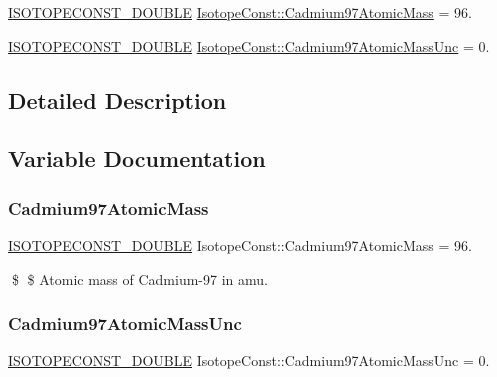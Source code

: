 \begin{DoxyCompactItemize}
\item 
\mbox{\hyperlink{group___isotope_const-_macros_ga8f45a7272ce02c0b4c65c44636ed719a}{I\+S\+O\+T\+O\+P\+E\+C\+O\+N\+S\+T\+\_\+\+D\+O\+U\+B\+LE}} \mbox{\hyperlink{group___isotope_const-_cadmium-_cd97_ga5261e2f44021d0584f46f1d3da004dc6}{Isotope\+Const\+::\+Cadmium97\+Atomic\+Mass}} = 96.
\item 
\mbox{\hyperlink{group___isotope_const-_macros_ga8f45a7272ce02c0b4c65c44636ed719a}{I\+S\+O\+T\+O\+P\+E\+C\+O\+N\+S\+T\+\_\+\+D\+O\+U\+B\+LE}} \mbox{\hyperlink{group___isotope_const-_cadmium-_cd97_gaddfb262f5f44c97405492b9e3bffd4db}{Isotope\+Const\+::\+Cadmium97\+Atomic\+Mass\+Unc}} = 0.
\end{DoxyCompactItemize}


\subsection{Detailed Description}


\subsection{Variable Documentation}
\mbox{\label{group___isotope_const-_cadmium-_cd97_ga5261e2f44021d0584f46f1d3da004dc6}} 
\subsubsection{\texorpdfstring{Cadmium97\+Atomic\+Mass}{Cadmium97AtomicMass}}
{\footnotesize\ttfamily \mbox{\hyperlink{group___isotope_const-_macros_ga8f45a7272ce02c0b4c65c44636ed719a}{I\+S\+O\+T\+O\+P\+E\+C\+O\+N\+S\+T\+\_\+\+D\+O\+U\+B\+LE}} Isotope\+Const\+::\+Cadmium97\+Atomic\+Mass = 96.}

\$ \$ Atomic mass of Cadmium-\/97 in amu. \mbox{\label{group___isotope_const-_cadmium-_cd97_gaddfb262f5f44c97405492b9e3bffd4db}} 
\subsubsection{\texorpdfstring{Cadmium97\+Atomic\+Mass\+Unc}{Cadmium97AtomicMassUnc}}
{\footnotesize\ttfamily \mbox{\hyperlink{group___isotope_const-_macros_ga8f45a7272ce02c0b4c65c44636ed719a}{I\+S\+O\+T\+O\+P\+E\+C\+O\+N\+S\+T\+\_\+\+D\+O\+U\+B\+LE}} Isotope\+Const\+::\+Cadmium97\+Atomic\+Mass\+Unc = 0.}

